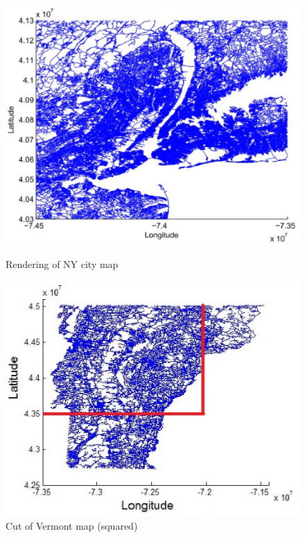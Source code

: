 \begin{figure}[ht] 
  \begin{minipage}[b]{0.45\linewidth}
    \centering
    \includegraphics[width=1\linewidth]{Images/Chapter7/NY} 
    \caption{Rendering of NY city map} 
    \label{fig:7-1} 
  \end{minipage}%
\hspace{5mm}
  \begin{minipage}[b]{0.45\linewidth}
    \centering
    \includegraphics[width=1\linewidth]{Images/Chapter7/VTcut} 
    \caption{Cut of Vermont map (squared)} 
	 \label{fig:7-2}
  \end{minipage} 
\end{figure}

